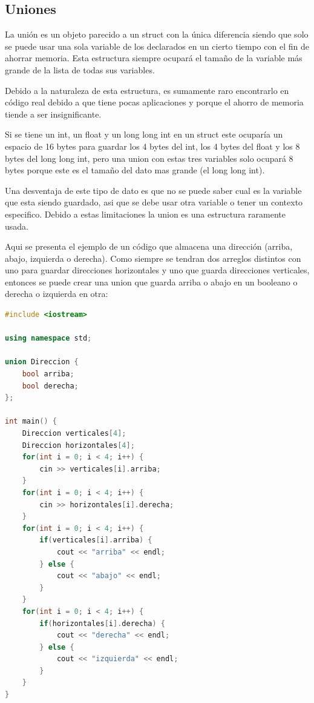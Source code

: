 \documentclass{article}
\begin{document}
\subsection{Uniones}

La unión es un objeto parecido a un struct con la única diferencia siendo que solo se puede usar una sola variable de los declarados en un cierto tiempo con el fin de ahorrar memoria. Esta estructura siempre ocupará el tamaño de la variable más grande de la lista de todas sus variables.

Debido a la naturaleza de esta estructura, es sumamente raro encontrarlo en código real debido a que tiene pocas aplicaciones y porque el ahorro de memoria tiende a ser insignificante.

Si se tiene un int, un float y un long long int en un struct este ocuparía un espacio de 16 bytes para guardar los 4 bytes del int, los 4 bytes del float y los 8 bytes del long long int, pero una union con estas tres variables solo ocupará 8 bytes porque este es el tamaño del dato mas grande (el long long int).

Una desventaja de este tipo de dato es que no se puede saber cual es la variable que esta siendo guardado, asi que se debe usar otra variable o tener un contexto especifico. Debido a estas limitaciones la union es una estructura raramente usada.

Aqui se presenta el ejemplo de un código que almacena una dirección (arriba, abajo, izquierda o derecha). Como siempre se tendran dos arreglos distintos con uno para guardar direcciones horizontales y uno que guarda direcciones verticales, entonces se puede crear una union que guarda arriba o abajo en un booleano o derecha o izquierda en otra:

\begin{lstlisting}[language=C++, caption=Uniones]
#include <iostream>

using namespace std;

union Direccion {
    bool arriba;
    bool derecha;
};

int main() {
    Direccion verticales[4];
    Direccion horizontales[4];
    for(int i = 0; i < 4; i++) {
        cin >> verticales[i].arriba;
    }
    for(int i = 0; i < 4; i++) {
        cin >> horizontales[i].derecha;
    }
    for(int i = 0; i < 4; i++) {
        if(verticales[i].arriba) {
            cout << "arriba" << endl;
        } else {
            cout << "abajo" << endl;
        }
    }
    for(int i = 0; i < 4; i++) {
        if(horizontales[i].derecha) {
            cout << "derecha" << endl;
        } else {
            cout << "izquierda" << endl;
        }
    }
}
\end{lstlisting}
\end{document}
